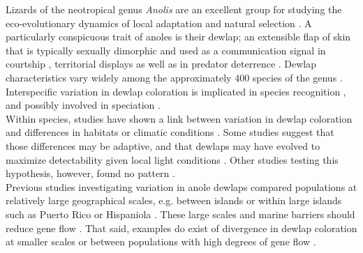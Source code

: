 
Lizards of the neotropical genus \textit{Anolis} are an excellent group for studying the eco-evolutionary dynamics of local adaptation and natural selection \citep{Losos2009}. A particularly conspicuous trait of anoles is their dewlap; an extensible flap of skin that is typically sexually dimorphic and used as a communication signal in courtship \citep{Sigmund1983, Driessens2014, Driessens2015}, territorial displays \citep{Losos1985, Macedonia1994, Macedonia2013} as well as in predator deterrence \citep{Leal1995, Leal1997, Leal1997b}. Dewlap characteristics vary widely among the approximately $400$ species of the genus \citep{Nicholson2007}. Interspecific variation in dewlap coloration is implicated in species recognition \citep{Rand1970b, Williams1969, Williams1977, Losos1985, Macedonia1994, Fleishman2000, Macedonia2013}, and possibly involved in speciation \citep{Lambert2013, Geneva2015, Ng2017}.\\

Within species, studies have shown a link between variation in dewlap coloration and differences in habitats or climatic conditions \citep{Macedonia2001, Leal2002, Thorpe2002a, Thorpe2002b, Leal2004, Vanhooydonck2009, Ng2012, Ng2013, Ng2016, Vanhooydonck2009, Driessens2017}. Some studies suggest that those differences may be adaptive, and that dewlaps may have evolved to maximize detectability given local light conditions \citep{Fleishman2001, Leal2002, Leal2004}. Other studies testing this hypothesis, however, found no pattern \citep{Fleishman2009, Ng2012, Macedonia2014a}.\\ 



Previous studies investigating variation in anole dewlaps compared populations at relatively large geographical scales, e.g. between islands \citep{Vanhooydonck2009, Driessens2017} or within large islands such as Puerto Rico \citep{Leal2002, Leal2004} or Hispaniola \citep{Ng2012, Ng2016}. These large scales and marine barriers should reduce gene flow \citep{Ng2011, Lambert2013, Richardson2014, Ng2017}. That said, examples do exist of divergence in dewlap coloration at smaller scales or between populations with high degrees of gene flow \citep{Thorpe2002a, Thorpe2002b, Stapley2011, Ng2016}.\\

